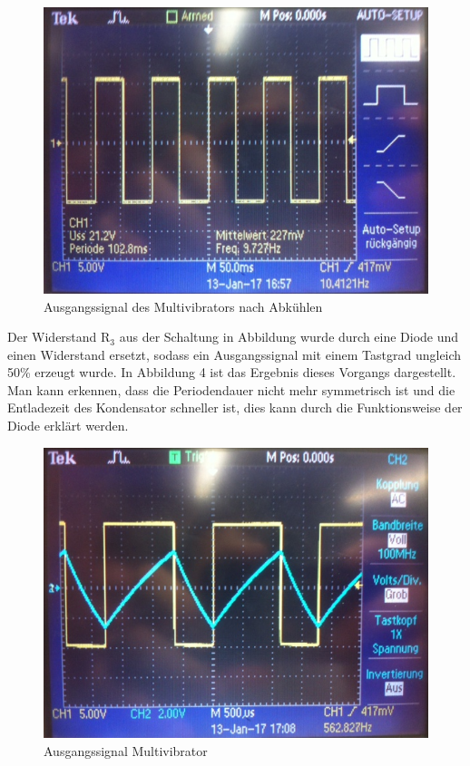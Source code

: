 \begin{figure}[!h]
\begin{center}
\includegraphics[scale=0.6]{bild/AusgangMultiNachAbkuhlen}
\caption{Ausgangssignal des Multivibrators nach Abk\"uhlen}
\end{center}
\end{figure}
Der Widerstand R$_3$ aus der Schaltung in Abbildung wurde durch eine Diode und einen Widerstand ersetzt, sodass ein Ausgangssignal mit einem Tastgrad ungleich 50\% erzeugt wurde. In Abbildung 4 ist das Ergebnis dieses Vorgangs dargestellt. Man kann erkennen, dass die Periodendauer nicht mehr symmetrisch ist und die Entladezeit des Kondensator schneller ist, dies kann durch die Funktionsweise der Diode erkl\"art werden.
\begin{figure}[!h]
\begin{center}
\includegraphics[scale=0.7]{bild/Ausgangauf50}
\caption{Ausgangssignal Multivibrator}
\end{center}
\end{figure}
\newpage